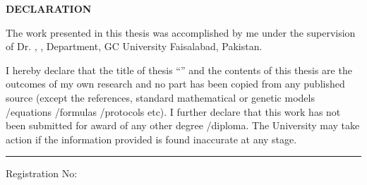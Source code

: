 \newpage

\begin{center} \large{\textbf{DECLARATION}}
\end{center}
\noindent \textbf{}

\noindent The work presented in this thesis was accomplished by me under the supervision of Dr. \supervisorName, \supervisorTitle, \studentDept Department, GC University Faisalabad, Pakistan.

\noindent  I hereby declare that the title of thesis ``\MakeUppercase{\thesisTitle}'' and the contents of this thesis are the outcomes of my own research and no part has been copied from any published source (except the references, standard mathematical or genetic models /equations /formulas /protocols etc). I further declare that this work has not been submitted for award of any other degree /diploma. The University may take action if the information provided is found inaccurate at any stage.



\vskip3cm

\hskip7cm  \noindent\rule{7.4cm}{0.4pt}

\hskip7cm  \studentName

\hskip7cm  Registration  No: \studentRegNo
